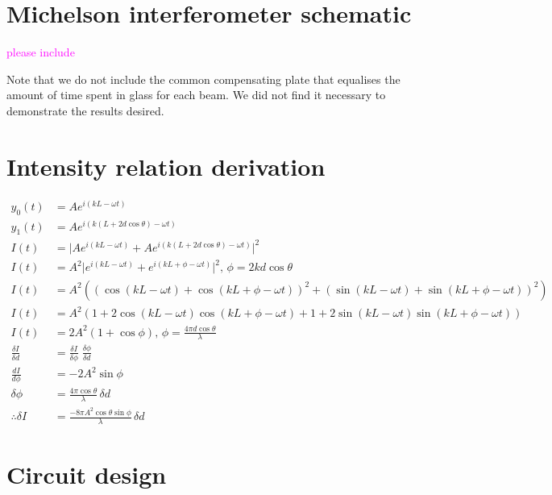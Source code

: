 \documentclass[prb,preprint]{revtex4-1}
\newcommand{\jam}{\textcolor{magenta}}
\begin{document}
\appendix

\section{Michelson interferometer schematic}
\jam{please include}

Note that we do not include the common compensating plate that equalises the amount of time spent in glass for each beam. We did not find it necessary to demonstrate the results desired.

\section{Intensity relation derivation}

\begin{align}
\label{eq:intensity_derivation}
    y_0(t) &= A e^{i (k L - \omega t)} \\
    y_1(t) &= A e^{i (k (L + 2 d \cos{\theta}) - \omega t)} \\
    I(t) &= \lvert A e^{i (k L - \omega t)} + A e^{i (k (L + 2 d \cos{\theta}) - \omega t)} \rvert^2 \\
    I(t) &= A^2 \lvert e^{i (k L - \omega t)} + e^{i (k L + \phi - \omega t)} \rvert^2,\, \phi = 2 k d \cos{\theta} \\
    I(t) &= A^2 ((\cos{(k L - \omega t)} + \cos{(k L + \phi - \omega t)})^2 + (\sin{(k L - \omega t)} + \sin{(k L + \phi - \omega t)})^2) \\
    I(t) &= A^2 (1 + 2 \cos{(k L - \omega t)} \cos{(k L + \phi - \omega t)} + 1 + 2 \sin{(k L - \omega t)} \sin{(k L + \phi - \omega t)}) \\
    I(t) &= 2 A^2 (1 + \cos{\phi}),\, \phi = \frac{4 \pi d \cos{\theta}}{\lambda} \\
    \frac{\delta I}{\delta d} &= \frac{\delta I}{\delta \phi}\; \frac{\delta \phi}{\delta d}\\
    \frac{dI}{d\phi} &= - 2 A^2 \sin{\phi}\\
    \delta\phi &= \frac{4 \pi \cos{\theta}}{\lambda}\, \delta d\\
    \therefore \delta I &= \frac{- 8 \pi A^2 \cos{\theta} \sin{\phi}}{\lambda}\, \delta d
\end{align}

\section{Circuit design}
\end{document}
